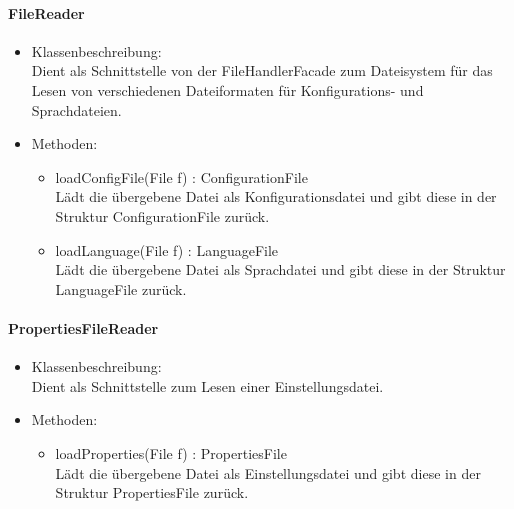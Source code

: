 \documentclass[parskip=full]{scrartcl}
\begin{document}
\paragraph{FileReader}%
\begin{itemize}
\item Klassenbeschreibung: \\
Dient als Schnittstelle von der FileHandlerFacade zum Dateisystem für das Lesen von verschiedenen Dateiformaten für Konfigurations- und Sprachdateien.
\item Methoden: \\
\begin{itemize}
\item loadConfigFile(File f) : ConfigurationFile \\
Lädt die übergebene Datei als Konfigurationsdatei und gibt diese in der Struktur ConfigurationFile zurück.
\item loadLanguage(File f) : LanguageFile \\
Lädt die übergebene Datei als Sprachdatei und gibt diese in der Struktur LanguageFile zurück.
\end{itemize}
\end{itemize}

\paragraph{PropertiesFileReader}
\begin{itemize}
\item Klassenbeschreibung: \\
Dient als Schnittstelle zum Lesen einer Einstellungsdatei.
\item Methoden: \\
\begin{itemize}
\item loadProperties(File f) : PropertiesFile \\
Lädt die übergebene Datei als Einstellungsdatei und gibt diese in der Struktur PropertiesFile zurück.
\end{itemize}
\end{itemize}
\end{document}
